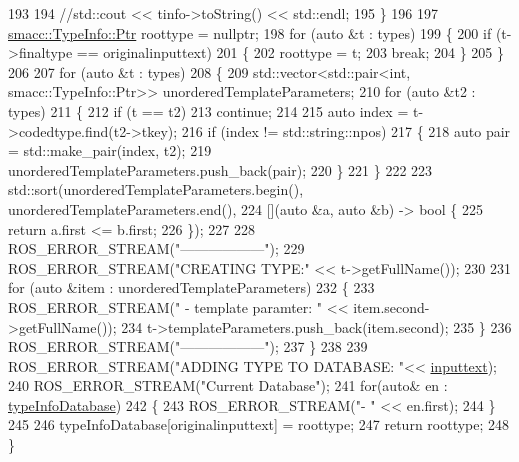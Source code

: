 \begin{DoxyCode}
193 
194         \textcolor{comment}{//std::cout << tinfo->toString() << std::endl;}
195     \}
196 
197     \hyperlink{classsmacc_1_1TypeInfo_aca0cd51c7c9ef85f6c98dc32878af226}{smacc::TypeInfo::Ptr} roottype = \textcolor{keyword}{nullptr};
198     \textcolor{keywordflow}{for} (\textcolor{keyword}{auto} &t : types)
199     \{
200         \textcolor{keywordflow}{if} (t->finaltype == originalinputtext)
201         \{
202             roottype = t;
203             \textcolor{keywordflow}{break};
204         \}
205     \}
206 
207     \textcolor{keywordflow}{for} (\textcolor{keyword}{auto} &t : types)
208     \{
209         std::vector<std::pair<int, smacc::TypeInfo::Ptr>> unorderedTemplateParameters;
210         \textcolor{keywordflow}{for} (\textcolor{keyword}{auto} &t2 : types)
211         \{
212             \textcolor{keywordflow}{if} (t == t2)
213                 \textcolor{keywordflow}{continue};
214 
215             \textcolor{keyword}{auto} index = t->codedtype.find(t2->tkey);
216             \textcolor{keywordflow}{if} (index != std::string::npos)
217             \{
218                 \textcolor{keyword}{auto} pair = std::make\_pair(index, t2);
219                 unorderedTemplateParameters.push\_back(pair);
220             \}
221         \}
222 
223         std::sort(unorderedTemplateParameters.begin(), unorderedTemplateParameters.end(),
224                   [](\textcolor{keyword}{auto} &a, \textcolor{keyword}{auto} &b) -> \textcolor{keywordtype}{bool} \{
225                       \textcolor{keywordflow}{return} a.first <= b.first;
226                   \});
227 
228         ROS\_ERROR\_STREAM(\textcolor{stringliteral}{"------------------"});
229         ROS\_ERROR\_STREAM(\textcolor{stringliteral}{"CREATING TYPE:"} << t->getFullName());
230 
231         \textcolor{keywordflow}{for} (\textcolor{keyword}{auto} &item : unorderedTemplateParameters)
232         \{
233             ROS\_ERROR\_STREAM(\textcolor{stringliteral}{" - template paramter: "} << item.second->getFullName());
234             t->templateParameters.push\_back(item.second);
235         \}
236         ROS\_ERROR\_STREAM(\textcolor{stringliteral}{"------------------"});
237     \}
238 
239     ROS\_ERROR\_STREAM(\textcolor{stringliteral}{"ADDING TYPE TO DATABASE: "}<< \hyperlink{namespaceregex__template_a5e23ed7a5dae7db8eb3cdae8fb3e3230}{inputtext});
240     ROS\_ERROR\_STREAM(\textcolor{stringliteral}{"Current Database"});
241     \textcolor{keywordflow}{for}(\textcolor{keyword}{auto}& en : \hyperlink{classsmacc_1_1TypeInfo_a5dafa5950a93f6cd5b88d5ea573a504c}{typeInfoDatabase})
242     \{
243         ROS\_ERROR\_STREAM(\textcolor{stringliteral}{"- "} << en.first);
244     \}
245 
246     typeInfoDatabase[originalinputtext] = roottype;
247     \textcolor{keywordflow}{return} roottype;
248 \}
\end{DoxyCode}



